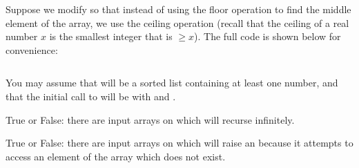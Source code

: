 \begin{prob}

    Suppose we modify  so that instead of using the floor operation
    to find the middle element of the array, we use the ceiling operation (recall that the
    ceiling of a real number $x$ is the smallest integer that is $\geq x$). The full code is
    shown below for convenience:

    \inputminted[lastline=14]{python}{\thisdir/code.py}

    You may assume that  will be a sorted list containing at least
    one number, and that the initial call to  will be
    with  and .

    \begin{subprobset}

        \begin{subprob}

            True or False:
            there are input arrays on which
             will recurse infinitely.

            \Tf{}

        \end{subprob}

        \begin{subprob}

            True or False: there are input arrays on which
             will raise an 
            because it attempts to access an element of the array which does
            not exist.

            \Tf{}

        \end{subprob}

    \end{subprobset}

\end{prob}
